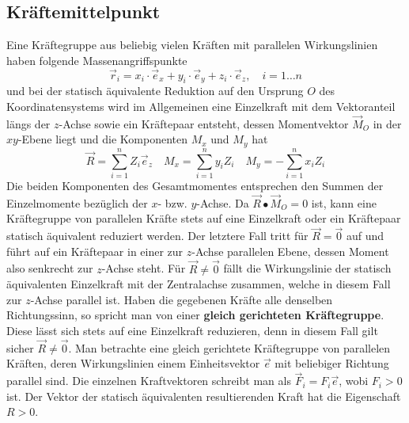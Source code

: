 \subsection{Kräftemittelpunkt}
Eine Kräftegruppe aus beliebig vielen Kräften mit parallelen Wirkungslinien haben folgende Massenangriffspunkte
\begin{equation}
\boxed{\overrightarrow{r}_i=x_i\cdot \overrightarrow{e}_x+y_i\cdot \overrightarrow{e}_y+z_i\cdot \overrightarrow{e}_z,\quad i=1\dotso n}
\end{equation}
und bei der statisch äquivalente Reduktion auf den Ursprung $O$ des Koordinatensystems wird im Allgemeinen eine Einzelkraft mit dem Vektoranteil längs der $z$-Achse sowie ein Kräftepaar entsteht, dessen Momentvektor $\overrightarrow{M}_O$ in der $xy$-Ebene liegt und die Komponenten $M_x$ und $M_y$ hat
\begin{equation}
\boxed{\overrightarrow{R}=\displaystyle \sum_{i=1}^nZ_i\overrightarrow{e}_z}\quad \boxed{M_x=\displaystyle \sum_{i=1}^ny_iZ_i}\quad \boxed{M_y=-\displaystyle \sum_{i=1}^nx_iZ_i}
\end{equation}
Die beiden Komponenten des Gesamtmomentes entsprechen den Summen der Einzelmomente bezüglich der $x$- bzw. $y$-Achse.
\newline\newline
Da $\overrightarrow{R}\bullet \overrightarrow{M}_O=0$ ist, kann eine Kräftegruppe von parallelen Kräfte stets auf eine Einzelkraft oder ein Kräftepaar statisch äquivalent reduziert werden. Der letztere Fall tritt für $\overrightarrow{R}=\overrightarrow{0}$ auf und führt auf ein Kräftepaar in einer zur $z$-Achse parallelen Ebene, dessen Moment also senkrecht zur $z$-Achse steht. Für $\overrightarrow{R}\neq \overrightarrow{0}$ fällt die Wirkungslinie der statisch äquivalenten Einzelkraft mit der Zentralachse zusammen, welche in diesem Fall zur $z$-Achse parallel ist.
\newline\newline
Haben die gegebenen Kräfte alle denselben Richtungssinn, so spricht man von einer \textbf{gleich gerichteten Kräftegruppe}. Diese lässt sich stets auf eine Einzelkraft reduzieren, denn in diesem Fall gilt sicher $\overrightarrow{R}\neq \overrightarrow{0}$.
\newline\newline
Man betrachte eine gleich gerichtete Kräftegruppe von parallelen Kräften, deren Wirkungslinien einem Einheitsvektor $\overrightarrow{e}$ mit beliebiger Richtung parallel sind. Die einzelnen Kraftvektoren schreibt man als $\overrightarrow{F}_i=F_i\overrightarrow{e}$, wobi $F_i>0$ ist. Der Vektor der statisch äquivalenten resultierenden Kraft hat die Eigenschaft $R>0$.
